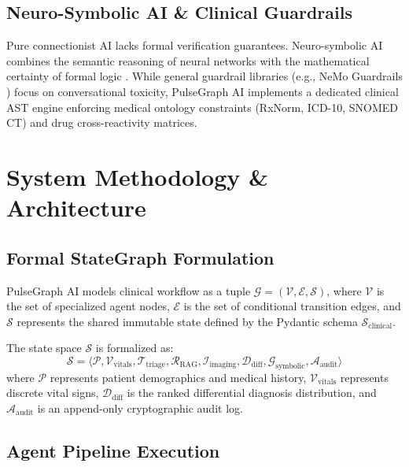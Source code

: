 \documentclass[conference]{IEEEtran}
\begin{document}
\subsection{Neuro-Symbolic AI \& Clinical Guardrails}
Pure connectionist AI lacks formal verification guarantees. Neuro-symbolic AI combines the semantic reasoning of neural networks with the mathematical certainty of formal logic \cite{marcus2020next, garcez2023neurosymbolic}. While general guardrail libraries (e.g., NeMo Guardrails \cite{rebedea2023nemo}) focus on conversational toxicity, PulseGraph AI implements a dedicated clinical AST engine enforcing medical ontology constraints (RxNorm, ICD-10, SNOMED CT) and drug cross-reactivity matrices.

\section{System Methodology \& Architecture}

\subsection{Formal StateGraph Formulation}
PulseGraph AI models clinical workflow as a tuple $\mathcal{G} = (\mathcal{V}, \mathcal{E}, \mathcal{S})$, where $\mathcal{V}$ is the set of specialized agent nodes, $\mathcal{E}$ is the set of conditional transition edges, and $\mathcal{S}$ represents the shared immutable state defined by the Pydantic schema $\mathcal{S}_{\text{clinical}}$.

The state space $\mathcal{S}$ is formalized as:
\begin{equation}
\mathcal{S} = \langle \mathcal{P}, \mathcal{V}_{\text{vitals}}, \mathcal{T}_{\text{triage}}, \mathcal{R}_{\text{RAG}}, \mathcal{I}_{\text{imaging}}, \mathcal{D}_{\text{diff}}, \mathcal{G}_{\text{symbolic}}, \mathcal{A}_{\text{audit}} \rangle
\end{equation}
where $\mathcal{P}$ represents patient demographics and medical history, $\mathcal{V}_{\text{vitals}}$ represents discrete vital signs, $\mathcal{D}_{\text{diff}}$ is the ranked differential diagnosis distribution, and $\mathcal{A}_{\text{audit}}$ is an append-only cryptographic audit log.

\subsection{Agent Pipeline Execution}
\end{document}
